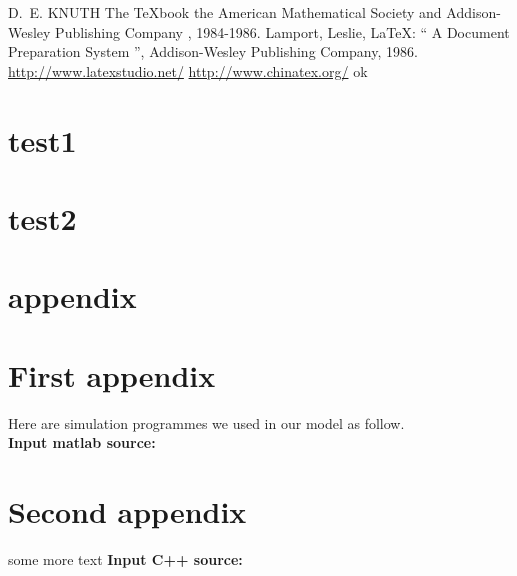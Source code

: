 \documentclass{mcmthesis}
\begin{document}
\begin{thebibliography}{99}
 D.~E. KNUTH   The \TeX{}book  the American
Mathematical Society and Addison-Wesley
Publishing Company , 1984-1986.
Lamport, Leslie,  \LaTeX{}: `` A Document Preparation System '',
Addison-Wesley Publishing Company, 1986.
\url{http://www.latexstudio.net/}
\url{http://www.chinatex.org/}
ok
\end{thebibliography}


\section{test1}


\section{test2}


\section{appendix}



\begin{appendices}

\section{First appendix}


Here are simulation programmes we used in our model as follow.\\

\textbf{\textcolor[rgb]{0.98,0.00,0.00}{Input matlab source:}}


\section{Second appendix}

some more text \textcolor[rgb]{0.98,0.00,0.00}{\textbf{Input C++ source:}}


\end{appendices}
\end{document}

